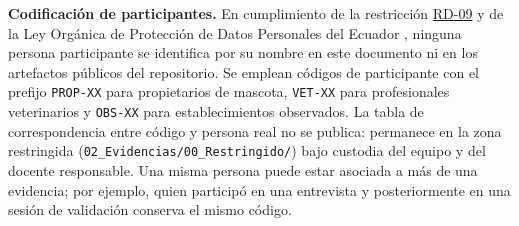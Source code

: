 \documentclass[journal,onecolumn]{IEEEtran}
\begin{document}
	\textbf{Codificación de participantes.} En cumplimiento de la restricción
	\hyperref[tab:RD-09]{RD-09} y de la Ley Orgánica de Protección de Datos Personales del Ecuador
	\cite{lopdp2021}, ninguna persona participante se identifica por su nombre
	en este documento ni en los artefactos públicos del repositorio. Se emplean
	códigos de participante con el prefijo \texttt{PROP-XX} para propietarios de
	mascota, \texttt{VET-XX} para profesionales veterinarios y \texttt{OBS-XX}
	para establecimientos observados. La tabla de correspondencia entre código y
	persona real no se publica: permanece en la zona restringida
	(\texttt{02\_Evidencias/00\_Restringido/}) bajo custodia del equipo y del
	docente responsable. Una misma persona puede estar asociada a más de una
	evidencia; por ejemplo, quien participó en una entrevista y posteriormente
	en una sesión de validación conserva el mismo código.
	
\end{document}
